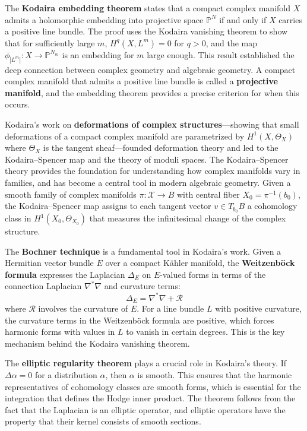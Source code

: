 The \textbf{Kodaira embedding theorem} states that a compact complex
manifold $X$ admits a holomorphic embedding into projective space
$\mathbb{P}^N$ if and only if $X$ carries a positive line bundle. The
proof uses the Kodaira vanishing theorem to show that for sufficiently
large $m$, $H^q(X, L^m) = 0$ for $q > 0$, and the map
$\phi_{|L^m|}: X \to \mathbb{P}^{N_m}$ is an embedding for $m$ large
enough. This result established the deep connection between complex
geometry and algebraic geometry. A compact complex manifold that admits
a positive line bundle is called a \textbf{projective manifold}, and the
embedding theorem provides a precise criterion for when this occurs.

Kodaira's work on \textbf{deformations of complex structures}---showing
that small deformations of a compact complex manifold are parametrized
by $H^1(X, \Theta_X)$ where $\Theta_X$ is the tangent sheaf---founded
deformation theory and led to the Kodaira--Spencer map and the theory of
moduli spaces. The Kodaira--Spencer theory provides the foundation for
understanding how complex manifolds vary in families, and has become a
central tool in modern algebraic geometry. Given a smooth family of
complex manifolds $\pi: \mathcal{X} \to B$ with central fiber $X_0 =
\pi^{-1}(b_0)$, the Kodaira--Spencer map assigns to each tangent vector
$v \in T_{b_0} B$ a cohomology class in $H^1(X_0, \Theta_{X_0})$ that
measures the infinitesimal change of the complex structure.

The \textbf{Bochner technique} is a fundamental tool in Kodaira's work.
Given a Hermitian vector bundle $E$ over a compact K{\"a}hler manifold,
the \textbf{Weitzenb{\"o}ck formula} expresses the Laplacian
$\Delta_E$ on $E$-valued forms in terms of the connection Laplacian
$\nabla^* \nabla$ and curvature terms:
\[\Delta_E = \nabla^* \nabla + \mathcal{R}\]
where $\mathcal{R}$ involves the curvature of $E$. For a line bundle
$L$ with positive curvature, the curvature terms in the Weitzenb{\"o}ck
formula are positive, which forces harmonic forms with values in $L$ to
vanish in certain degrees. This is the key mechanism behind the
Kodaira vanishing theorem.

The \textbf{elliptic regularity theorem} plays a crucial role in
Kodaira's theory. If $\Delta \alpha = 0$ for a distribution $\alpha$,
then $\alpha$ is smooth. This ensures that the harmonic representatives
of cohomology classes are smooth forms, which is essential for the
integration that defines the Hodge inner product. The theorem follows
from the fact that the Laplacian is an elliptic operator, and elliptic
operators have the property that their kernel consists of smooth
sections.

